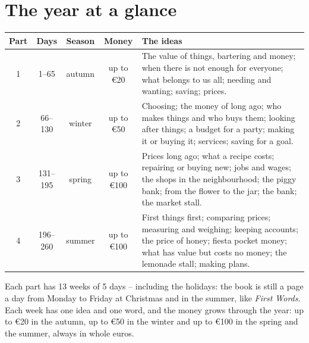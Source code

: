 \section*{The year at a glance}

\begin{center}
\renewcommand{\arraystretch}{1.4}
\begin{tabularx}{\linewidth}{@{}c c c c X@{}}
\toprule
\textbf{Part} & \textbf{Days} & \textbf{Season} & \textbf{Money} & \textbf{The ideas} \\
\midrule
1 & 1--65 & autumn & up to €20 & The value of things, bartering and
money; when there is not enough for everyone; what belongs to us all;
needing and wanting; saving; prices. \\
2 & 66--130 & winter & up to €50 & Choosing; the money of long ago; who
makes things and who buys them; looking after things; a budget for a
party; making it or buying it; services; saving for a goal. \\
3 & 131--195 & spring & up to €100 & Prices long ago; what a recipe
costs; repairing or buying new; jobs and wages; the shops in the
neighbourhood; the piggy bank; from the flower to the jar; the bank; the
market stall. \\
4 & 196--260 & summer & up to €100 & First things first; comparing
prices; measuring and weighing; keeping accounts; the price of honey;
fiesta pocket money; what has value but costs no money; the lemonade
stall; making plans. \\
\bottomrule
\end{tabularx}
\end{center}

\vspace{6mm}
Each part has 13 weeks of 5 days -- including the holidays: the book is
still a page a day from Monday to Friday at Christmas and in the summer,
like \emph{First Words}. Each week has one idea and one word, and the
money grows through the year: up to €20 in the autumn, up to €50 in the
winter and up to €100 in the spring and the summer, always in whole
euros.
\newpage
